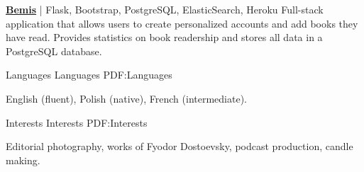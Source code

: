\documentclass[letterpaper,MMMyyyy,nonstopmode]{simpleresumecv}
\begin{document}
\begin{Body}
\BigGap
\Entry
\href{https://github.com/miloszkowal/bemis}
{\textbf{Bemis}} | Flask, Bootstrap, PostgreSQL, ElasticSearch, Heroku
\hfill
\Gap
Full-stack application that allows users to create personalized accounts and add books they have read. Provides statistics on book readership and stores all data in a PostgreSQL database.







\noindent\hrulefill
\Section
{Languages}
{Languages}
{PDF:Languages}

English (fluent), Polish (native), French (intermediate).


\Section
{Interests}
{Interests}
{PDF:Interests}

Editorial photography, works of Fyodor Dostoevsky, podcast production, candle making.



\end{Body}


\BigGap
\UseNoteFont%
\null\hfill%
\end{document}
